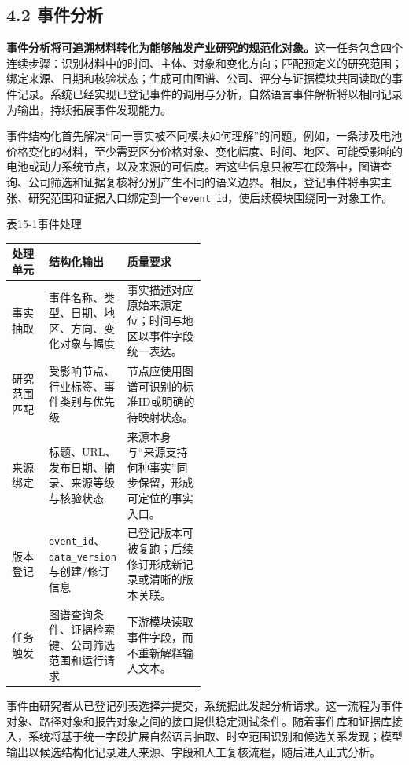 \subsection*{4.2 事件分析}\label{page:15}
\noindent\textbf{事件分析将可追溯材料转化为能够触发产业研究的规范化对象。}这一任务包含四个连续步骤：识别材料中的时间、主体、对象和变化方向；匹配预定义的研究范围；绑定来源、日期和核验状态；生成可由图谱、公司、评分与证据模块共同读取的事件记录。系统已经实现已登记事件的调用与分析，自然语言事件解析将以相同记录为输出，持续拓展事件发现能力\cite{lhy-contracts,lhy-architecture}。

事件结构化首先解决“同一事实被不同模块如何理解”的问题。例如，一条涉及电池价格变化的材料，至少需要区分价格对象、变化幅度、时间、地区、可能受影响的电池或动力系统节点，以及来源的可信度。若这些信息只被写在段落中，图谱查询、公司筛选和证据复核将分别产生不同的语义边界。相反，登记事件将事实主张、研究范围和证据入口绑定到一个\texttt{event\_id}，使后续模块围绕同一对象工作。

\begin{center}\small 表15-1\quad 事件处理\par\vspace{1mm}
\begin{tabularx}{\linewidth}{p{0.19\linewidth}p{0.30\linewidth}X}
\toprule
处理单元 & 结构化输出 & 质量要求\\
\midrule
事实抽取 & 事件名称、类型、日期、地区、方向、变化对象与幅度 & 事实描述对应原始来源定位；时间与地区以事件字段统一表达。\\
研究范围匹配 & 受影响节点、行业标签、事件类别与优先级 & 节点应使用图谱可识别的标准ID或明确的待映射状态。\\
来源绑定 & 标题、URL、发布日期、摘录、来源等级与核验状态 & 来源本身与“来源支持何种事实”同步保留，形成可定位的事实入口。\\
版本登记 & \texttt{event\_id}、\texttt{data\_version}与创建/修订信息 & 已登记版本可被复跑；后续修订形成新记录或清晰的版本关联。\\
任务触发 & 图谱查询条件、证据检索键、公司筛选范围和运行请求 & 下游模块读取事件字段，而不重新解释输入文本。\\
\bottomrule
\end{tabularx}\end{center}

事件由研究者从已登记列表选择并提交，系统据此发起分析请求。这一流程为事件对象、路径对象和报告对象之间的接口提供稳定测试条件。随着事件库和证据库接入，系统将基于统一字段扩展自然语言抽取、时空范围识别和候选关系发现；模型输出以候选结构化记录进入来源、字段和人工复核流程，随后进入正式分析。

